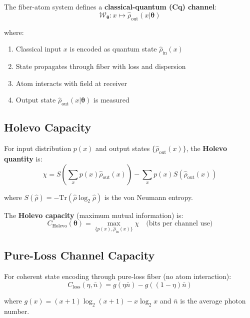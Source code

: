 \documentclass[12pt,a4paper]{article}
\begin{document}
The fiber-atom system defines a \textbf{classical-quantum (Cq) channel}:
\begin{equation}
\mathcal{W}_{\boldsymbol{\theta}}: x \mapsto \hat{\rho}_{\text{out}}(x|\boldsymbol{\theta})
\end{equation}

where:
\begin{enumerate}
\item Classical input $x$ is encoded as quantum state $\hat{\rho}_{\text{in}}(x)$
\item State propagates through fiber with loss and dispersion
\item Atom interacts with field at receiver
\item Output state $\hat{\rho}_{\text{out}}(x|\boldsymbol{\theta})$ is measured
\end{enumerate}

\subsection{Holevo Capacity}

For input distribution $p(x)$ and output states $\{\hat{\rho}_{\text{out}}(x)\}$, the \textbf{Holevo quantity} is:
\begin{equation}
\chi = S\left(\sum_x p(x)\hat{\rho}_{\text{out}}(x)\right) - \sum_x p(x) S(\hat{\rho}_{\text{out}}(x)) \label{eq:holevo_chi}
\end{equation}

where $S(\hat{\rho}) = -\text{Tr}(\hat{\rho}\log_2\hat{\rho})$ is the von Neumann entropy.

The \textbf{Holevo capacity} (maximum mutual information) is:
\begin{equation}
C_{\text{Holevo}}(\boldsymbol{\theta}) = \max_{\{p(x), \hat{\rho}_{\text{in}}(x)\}} \chi \quad \text{(bits per channel use)} \label{eq:holevo_capacity}
\end{equation}

\subsection{Pure-Loss Channel Capacity}

For coherent state encoding through pure-loss fiber (no atom interaction):
\begin{equation}
C_{\text{loss}}(\eta, \bar{n}) = g(\eta\bar{n}) - g((1-\eta)\bar{n}) \label{eq:pure_loss_capacity}
\end{equation}

where $g(x) = (x+1)\log_2(x+1) - x\log_2 x$ and $\bar{n}$ is the average photon number.
\end{document}
